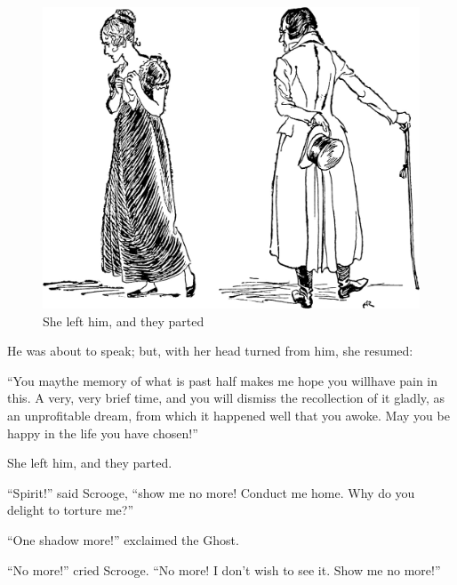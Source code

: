 \documentclass[paper=5.5in:8.5in,BCOR=7mm,twoside,DIV=calc,12pt,usegeometry]{scrbook} %
\begin{document}
\begin{figure}[tbh]
\begin{minipage}[c]{\linewidth}
\includegraphics[width=\linewidth]{breakup}
\caption*{She left him, and they parted}
\end{minipage}
\end{figure}

He was about to speak; but, with her head turned from him, she resumed:

\enquote{You may\textemdash the memory of what is past half makes me hope you will\textemdash have pain in this. A very, very brief time, and you will dismiss the recollection of it gladly, as an unprofitable dream, from which it happened well that you awoke. May you be happy in the life you have chosen!}

She left him, and they parted.

\enquote{Spirit!} said Scrooge, \enquote{show me no more! Conduct me home. Why do you delight to torture me?}

\enquote{One shadow more!} exclaimed the Ghost.

\enquote{No more!} cried Scrooge. \enquote{No more! I don't wish to see it. Show me no more!}
\end{document}
